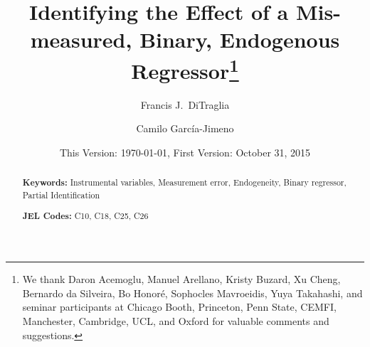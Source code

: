 \documentclass[12pt]{article}
\title{Identifying the Effect of a Mis-measured, Binary, Endogenous Regressor\footnote{We thank Daron Acemoglu, Manuel Arellano, Kristy Buzard, Xu Cheng, Bernardo da Silveira, Bo Honor\'{e}, Sophocles Mavroeidis, Yuya Takahashi, and seminar participants at Chicago Booth, Princeton, Penn State, CEMFI, Manchester, Cambridge, UCL, and Oxford for valuable comments and suggestions.}}
\author[1]{Francis J.\ DiTraglia}
\author[1,2]{Camilo Garc\'{i}a-Jimeno}
\affil[1]{\normalsize Department of Economics, University of Pennsylvania}
\affil[2]{\normalsize NBER}
\date{\small This Version: \today, First Version: October 31, 2015}
\begin{document}
\maketitle


\begin{abstract}
  \singlespacing
	

  	\bigskip
	\noindent\textbf{Keywords:} Instrumental variables, Measurement error, Endogeneity, Binary regressor, Partial Identification

	\medskip
  \noindent\textbf{JEL Codes:} C10, C18, C25, C26
\end{abstract}

\newpage









\appendix




\end{document}
